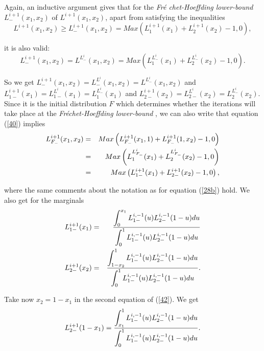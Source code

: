 \documentclass[onecolumn]{article}
\providecommand{\dint}{\displaystyle\int}
\renewcommand{\dint}{\displaystyle\int}
\begin{document}
Again, an inductive argument gives that for the \textit{Fr\'{e}%
chet-Hoeffding lower-bound} $L_{-}^{i+1}(x_{1},x_{2})$ of $%
L^{i+1}(x_{1},x_{2})$, apart from satisfying the inequalities 
\begin{equation}
L^{i+1}(x_{1},x_{2})\geq
L_{-}^{i+1}(x_{1},x_{2})=Max(L_{1}^{i+1}(x_{1})+L_{2}^{i+1}(x_{2})-1,0),
\label{39}
\end{equation}

it is also valid:%
\begin{equation}
L_{-}^{i+1}(x_{1},x_{2})=L^{L_{-}^{i}}(x_{1},x_{2})=Max\left(
L_{1}^{L_{-}^{i}}(x_{1})+L_{2}^{L_{-}^{i}}(x_{2})-1,0\right) .  \label{40}
\end{equation}

So we get $%
L_{-}^{i+1}(x_{1},x_{2})=L_{-}^{L^{i}}(x_{1},x_{2})=L^{L_{-}^{i}}(x_{1},x_{2}) 
$ and $L_{1-}^{i+1}(x_{1})=L_{1-}^{L^{i}}(x_{1})=L_{1}^{L_{-}^{i}}(x_{1})$
and $L_{2-}^{i+1}(x_{2})=L_{2-}^{L^{i}}(x_{2})=L_{2}^{L_{-}^{i}}(x_{2})$.
Since it is the initial distribution $F$ which determines whether the
iterations will take place at the \textit{Fr\'{e}chet-Hoeffding lower-bound}%
, we can also write that equation (\ref{40}) implies%
\begin{eqnarray}
L_{F_{-}}^{i+1}(x_{1},x_{2}) &=&Max\left(
L_{F_{-}}^{i+1}(x_{1},1)+L_{F_{-}}^{i+1}(1,x_{2})-1,0\right)  \notag \\
&=&Max\left(
L_{1}^{L_{F_{-}}^{i}}(x_{1})+L_{2}^{L_{F_{-}}^{i}}(x_{2})-1,0\right)  \notag
\\
&=&Max\left( L_{1-}^{i+1}(x_{1})+L_{2-}^{i+1}(x_{2})-1,0\right) ,  \label{41}
\end{eqnarray}

where the same comments about the notation as for equation (\ref{28b}) hold.
We also get for the marginals%
\begin{eqnarray}
L_{1-}^{i+1}(x_{1}) &=&\frac{\dint%
\nolimits_{0}^{x_{1}}L_{1-}^{i,-1}(u)L_{2-}^{i,-1}(1-u)du}{%
\dint\nolimits_{0}^{1}L_{1-}^{i,-1}(u)L_{2-}^{i,-1}(1-u)du}  \notag \\
L_{2-}^{i+1}(x_{2}) &=&\frac{\dint%
\nolimits_{1-x_{2}}^{1}L_{1-}^{i,-1}(u)L_{2-}^{i,-1}(1-u)du}{%
\dint\nolimits_{0}^{1}L_{1-}^{i,-1}(u)L_{2-}^{i,-1}(1-u)du}.  \label{42}
\end{eqnarray}

Take now $x_{2}=1-x_{1}$ in the second equation of (\ref{42}). We get%
\begin{equation}
L_{2-}^{i+1}(1-x_{1})=\frac{\dint%
\nolimits_{x_{1}}^{1}L_{1-}^{i,-1}(u)L_{2-}^{i,-1}(1-u)du}{%
\dint\nolimits_{0}^{1}L_{1-}^{i,-1}(u)L_{2-}^{i,-1}(1-u)du}.  \label{42.1}
\end{equation}
\end{document}
